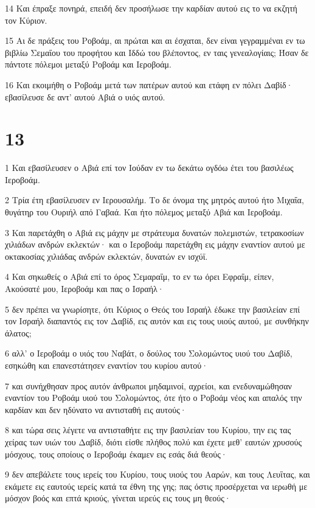 \par 14 Και έπραξε πονηρά, επειδή δεν προσήλωσε την καρδίαν αυτού εις το να εκζητή τον Κύριον.
\par 15 Αι δε πράξεις του Ροβοάμ, αι πρώται και αι έσχαται, δεν είναι γεγραμμέναι εν τω βιβλίω Σεμαΐου του προφήτου και Ιδδώ του βλέποντος, εν ταις γενεαλογίαις; Ήσαν δε πάντοτε πόλεμοι μεταξύ Ροβοάμ και Ιεροβοάμ.
\par 16 Και εκοιμήθη ο Ροβοάμ μετά των πατέρων αυτού και ετάφη εν πόλει Δαβίδ· εβασίλευσε δε αντ' αυτού Αβιά ο υιός αυτού.

\chapter{13}

\par 1 Και εβασίλευσεν ο Αβιά επί τον Ιούδαν εν τω δεκάτω ογδόω έτει του βασιλέως Ιεροβοάμ.
\par 2 Τρία έτη εβασίλευσεν εν Ιερουσαλήμ. Το δε όνομα της μητρός αυτού ήτο Μιχαΐα, θυγάτηρ του Ουριήλ από Γαβαά. Και ήτο πόλεμος μεταξύ Αβιά και Ιεροβοάμ.
\par 3 Και παρετάχθη ο Αβιά εις μάχην με στράτευμα δυνατών πολεμιστών, τετρακοσίων χιλιάδων ανδρών εκλεκτών· και ο Ιεροβοάμ παρετάχθη εις μάχην εναντίον αυτού με οκτακοσίας χιλιάδας ανδρών εκλεκτών, δυνατών εν ισχύϊ.
\par 4 Και σηκωθείς ο Αβιά επί το όρος Σεμαραΐμ, το εν τω όρει Εφραΐμ, είπεν, Ακούσατέ μου, Ιεροβοάμ και πας ο Ισραήλ·
\par 5 δεν πρέπει να γνωρίσητε, ότι Κύριος ο Θεός του Ισραήλ έδωκε την βασιλείαν επί τον Ισραήλ διαπαντός εις τον Δαβίδ, εις αυτόν και εις τους υιούς αυτού, με συνθήκην άλατος;
\par 6 αλλ' ο Ιεροβοάμ ο υιός του Ναβάτ, ο δούλος του Σολομώντος υιού του Δαβίδ, εσηκώθη και επανεστάτησεν εναντίον του κυρίου αυτού·
\par 7 και συνήχθησαν προς αυτόν άνθρωποι μηδαμινοί, αχρείοι, και ενεδυναμώθησαν εναντίον του Ροβοάμ υιού του Σολομώντος, ότε ήτο ο Ροβοάμ νέος και απαλός την καρδίαν και δεν ηδύνατο να αντισταθή εις αυτούς·
\par 8 και τώρα σεις λέγετε να αντισταθήτε εις την βασιλείαν του Κυρίου, την εις τας χείρας των υιών του Δαβίδ, διότι είσθε πλήθος πολύ και έχετε μεθ' εαυτών χρυσούς μόσχους, τους οποίους ο Ιεροβοάμ έκαμεν εις εσάς διά θεούς·
\par 9 δεν απεβάλετε τους ιερείς του Κυρίου, τους υιούς του Ααρών, και τους Λευΐτας, και εκάμετε εις εαυτούς ιερείς κατά τα έθνη της γης; πας όστις προσέρχεται να ιερωθή με μόσχον βοός και επτά κριούς, γίνεται ιερεύς εις τους μη θεούς·
